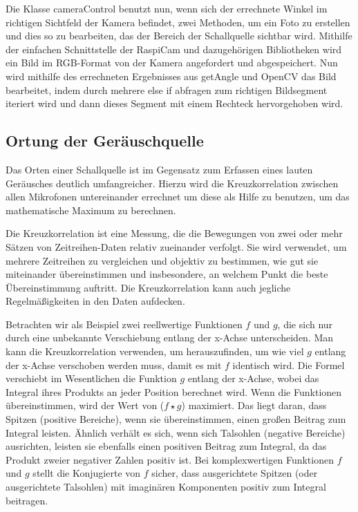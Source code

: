 Die Klasse cameraControl benutzt nun, wenn sich der errechnete Winkel im richtigen Sichtfeld der Kamera befindet, zwei Methoden, um ein Foto zu erstellen und dies so zu bearbeiten, das der Bereich der Schallquelle sichtbar wird. Mithilfe der einfachen Schnittstelle der RaspiCam und dazugehörigen Bibliotheken wird ein Bild im RGB-Format von der Kamera angefordert und abgespeichert. Nun wird mithilfe des errechneten Ergebnisses aus getAngle und OpenCV das Bild bearbeitet, indem durch mehrere else if abfragen zum richtigen Bildsegment iteriert wird und dann dieses Segment mit einem Rechteck hervorgehoben wird.


\subsection{Ortung der Geräuschquelle}

Das Orten einer Schallquelle ist im Gegensatz zum Erfassen eines lauten Geräusches deutlich umfangreicher. Hierzu wird die Kreuzkorrelation zwischen allen Mikrofonen untereinander errechnet um diese als Hilfe zu benutzen, um das mathematische Maximum zu berechnen.

Die Kreuzkorrelation ist eine Messung, die die Bewegungen von zwei oder mehr Sätzen von Zeitreihen-Daten relativ zueinander verfolgt. Sie wird verwendet, um mehrere Zeitreihen zu vergleichen und objektiv zu bestimmen, wie gut sie miteinander übereinstimmen und insbesondere, an welchem Punkt die beste Übereinstimmung auftritt. Die Kreuzkorrelation kann auch jegliche Regelmäßigkeiten in den Daten aufdecken.

Betrachten wir als Beispiel zwei reellwertige Funktionen $ f $ und $ g $, die sich nur durch eine unbekannte Verschiebung entlang der x-Achse unterscheiden. Man kann die Kreuzkorrelation verwenden, um herauszufinden, um wie viel $ g $ entlang der x-Achse verschoben werden muss, damit es mit $ f $ identisch wird. Die Formel verschiebt im Wesentlichen die Funktion $ g $ entlang der x-Achse, wobei das Integral ihres Produkts an jeder Position berechnet wird. Wenn die Funktionen übereinstimmen, wird der Wert von ($ f \star g $) maximiert. Das liegt daran, dass Spitzen (positive Bereiche), wenn sie übereinstimmen, einen großen Beitrag zum Integral leisten. Ähnlich verhält es sich, wenn sich Talsohlen (negative Bereiche) ausrichten, leisten sie ebenfalls einen positiven Beitrag zum Integral, da das Produkt zweier negativer Zahlen positiv ist. Bei komplexwertigen Funktionen $ f $ und $ g $ stellt die Konjugierte von $ f $ sicher, dass ausgerichtete Spitzen (oder ausgerichtete Talsohlen) mit imaginären Komponenten positiv zum Integral beitragen.

